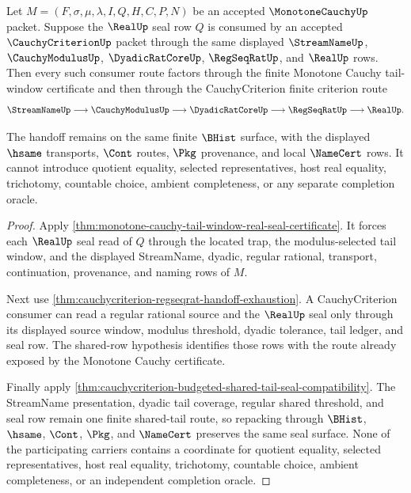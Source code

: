 \begin{theorem}
\label{thm:monotone-cauchy-cauchycriterion-seal-handoff}
Let $M=(F,\sigma,\mu,\lambda,I,Q,H,C,P,N)$ be an accepted $\MonotoneCauchyUp$ packet. Suppose the $\RealUp$ seal row $Q$ is consumed by an accepted $\CauchyCriterionUp$ packet through the same displayed $\StreamNameUp$, $\CauchyModulusUp$, $\DyadicRatCoreUp$, $\RegSeqRatUp$, and $\RealUp$ rows. Then every such consumer route factors through the finite Monotone Cauchy tail-window certificate and then through the CauchyCriterion finite criterion route
$$
\StreamNameUp
\longrightarrow
\CauchyModulusUp
\longrightarrow
\DyadicRatCoreUp
\longrightarrow
\RegSeqRatUp
\longrightarrow
\RealUp .
$$

The handoff remains on the same finite $\BHist$ surface, with the displayed $\hsame$ transports, $\Cont$ routes, $\Pkg$ provenance, and local $\NameCert$ rows. It cannot introduce quotient equality, selected representatives, host real equality, trichotomy, countable choice, ambient completeness, or any separate completion oracle.
\end{theorem}
\begin{proof}
Apply \autoref{thm:monotone-cauchy-tail-window-real-seal-certificate}. It forces each $\RealUp$ seal read of $Q$ through the located trap, the modulus-selected tail window, and the displayed StreamName, dyadic, regular rational, transport, continuation, provenance, and naming rows of $M$.

Next use \autoref{thm:cauchycriterion-regseqrat-handoff-exhaustion}. A CauchyCriterion consumer can read a regular rational source and the $\RealUp$ seal only through its displayed source window, modulus threshold, dyadic tolerance, tail ledger, and seal row. The shared-row hypothesis identifies those rows with the route already exposed by the Monotone Cauchy certificate.

Finally apply \autoref{thm:cauchycriterion-budgeted-shared-tail-seal-compatibility}. The StreamName presentation, dyadic tail coverage, regular shared threshold, and seal row remain one finite shared-tail route, so repacking through $\BHist$, $\hsame$, $\Cont$, $\Pkg$, and $\NameCert$ preserves the same seal surface. None of the participating carriers contains a coordinate for quotient equality, selected representatives, host real equality, trichotomy, countable choice, ambient completeness, or an independent completion oracle.
\end{proof}

